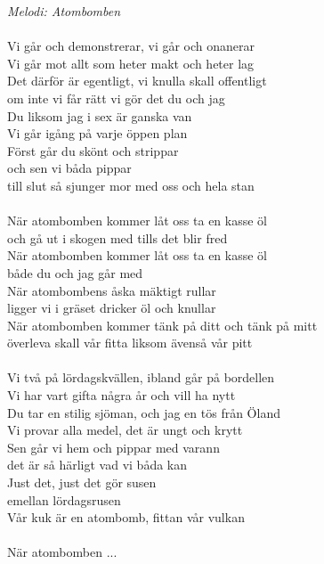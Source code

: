 {\footnotesize\textit{Melodi: Atombomben}}\\
\\
Vi går och demonstrerar, vi går och onanerar\\
Vi går mot allt som heter makt och heter lag\\
Det därför är egentligt, vi knulla skall offentligt\\
om inte vi får rätt vi gör det du och jag\\
Du liksom jag i sex är ganska van\\
Vi går igång på varje öppen plan\\
Först går du skönt och strippar\\
och sen vi båda pippar\\
till slut så sjunger mor med oss och hela stan\\
\\
När atombomben kommer låt oss ta en kasse öl\\
och gå ut i skogen med tills det blir fred\\
När atombomben kommer låt oss ta en kasse öl\\
både du och jag går med\\
När atombombens åska mäktigt rullar\\
ligger vi i gräset dricker öl och knullar\\
När atombomben kommer tänk på ditt och tänk på mitt\\
överleva skall vår fitta liksom ävenså vår pitt\\
\\
Vi två på lördagskvällen, ibland går på bordellen\\
Vi har vart gifta några år och vill ha nytt\\
Du tar en stilig sjöman, och jag en tös från Öland\\
Vi provar alla medel, det är ungt och krytt\\
Sen går vi hem och pippar med varann\\
det är så härligt vad vi båda kan\\
Just det, just det gör susen\\
emellan lördagsrusen\\
Vår kuk är en atombomb, fittan vår vulkan\\
\\
När atombomben ...
